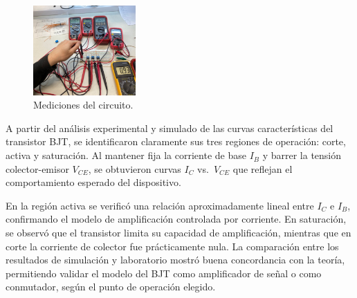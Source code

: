     \begin{figure}
      \centering
      \includegraphics[width=0.35\textwidth]{pictures/setup_crkt-2.jpeg}
      \caption{Mediciones del circuito.}
    \end{figure}
    A partir del análisis experimental y simulado de las curvas características del transistor BJT, se identificaron
    claramente sus tres regiones de operación: corte, activa y saturación. Al mantener fija la corriente de base $I_B$ y
    barrer la tensión colector-emisor $V_{CE}$, se obtuvieron curvas $I_C$ vs.\ $V_{CE}$ que reflejan el comportamiento
    esperado del dispositivo.

    En la región activa se verificó una relación aproximadamente lineal entre $I_C$ e $I_B$, confirmando el modelo de
    amplificación controlada por corriente. En saturación, se observó que el transistor limita su capacidad de
    amplificación, mientras que en corte la corriente de colector fue prácticamente nula. La comparación entre los
    resultados de simulación y laboratorio mostró buena concordancia con la teoría, permitiendo validar el modelo del
    BJT como amplificador de señal o como conmutador, según el punto de operación elegido.
